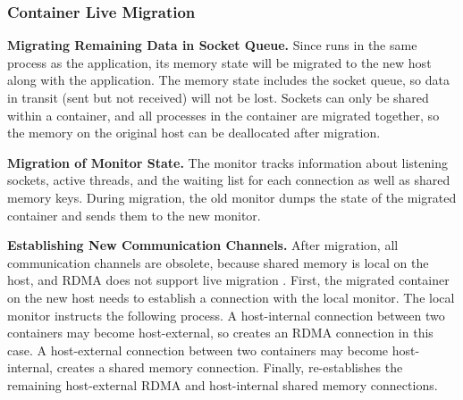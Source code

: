 \subsubsection{Container Live Migration}
\label{socksdirect:subsubsec:container_live_migration}

\textbf{Migrating Remaining Data in Socket Queue.}
Since \libipc {} runs in the same process as the application, its memory state will be migrated to the new host along with the application.
The memory state includes the socket queue, so data in transit (sent but not received) will not be lost.
Sockets can only be shared within a container, and all processes in the container are migrated together, so the memory on the original host can be deallocated after migration.

\textbf{Migration of Monitor State.}
The monitor tracks information about listening sockets, active threads, and the waiting list for each connection as well as shared memory keys.
During migration, the old monitor dumps the state of the migrated container and sends them to the new monitor.

\textbf{Establishing New Communication Channels.}
After migration, all communication channels are obsolete, because shared memory is local on the host, and RDMA does not support live migration \cite{nsdi19freeflow,slim}.
First, the migrated container on the new host needs to establish a connection with the local monitor.
The local monitor instructs the following process.
A host-internal connection between two containers may become host-external, so \libipc {} creates an RDMA connection in this case.
A host-external connection between two containers may become host-internal, \libipc {} creates a shared memory connection.
Finally, \libipc {} re-establishes the remaining host-external RDMA and host-internal shared memory connections.

%


